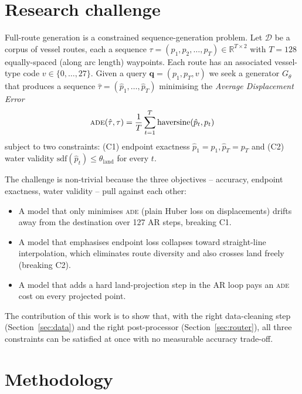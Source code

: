 \documentclass[oneside, a4paper, onecolumn, 11pt]{article}
\newcommand{\ade}{\textsc{ade}}
\begin{document}
\section{Research challenge}\label{sec:challenge}

Full-route generation is a constrained sequence-generation problem.
Let $\mathcal{D}$ be a corpus of vessel routes, each a sequence
$\tau = (p_1, p_2, \ldots, p_T) \in \mathbb{R}^{T \times 2}$ with
$T = 128$ equally-spaced (along arc length) waypoints.  Each route has
an associated vessel-type code $v \in \{0, \ldots, 27\}$.
Given a query $\mathbf{q} = (p_1, p_T, v)$ we seek a generator
$G_\theta$ that produces a sequence
$\hat\tau = (\hat p_1, \ldots, \hat p_T)$ minimising the
\emph{Average Displacement Error}
\[
  \ade(\hat\tau, \tau)
    = \frac{1}{T} \sum_{t=1}^{T} \mathrm{haversine}(\hat p_t, p_t)
\]
subject to two constraints:
(C1) endpoint exactness $\hat p_1 = p_1, \hat p_T = p_T$ and
(C2) water validity $\mathrm{sdf}(\hat p_t) \leq \theta_{\mathrm{land}}$
     for every $t$.

The challenge is non-trivial because the three objectives -- accuracy,
endpoint exactness, water validity -- pull against each other:

\begin{itemize}[leftmargin=*]
  \item A model that only minimises \ade{} (plain Huber loss on
        displacements) drifts away from the destination over 127 AR
        steps, breaking C1.
  \item A model that emphasises endpoint loss collapses toward
        straight-line interpolation, which eliminates route diversity
        and also crosses land freely (breaking C2).
  \item A model that adds a hard land-projection step in the AR loop
        pays an \ade{} cost on every projected point.
\end{itemize}

The contribution of this work is to show that, with the right
data-cleaning step (Section~\ref{sec:data}) and the right
post-processor (Section~\ref{sec:router}), all three constraints can be
satisfied at once with no measurable accuracy trade-off.

\section{Methodology}\label{sec:methodology}
\end{document}
